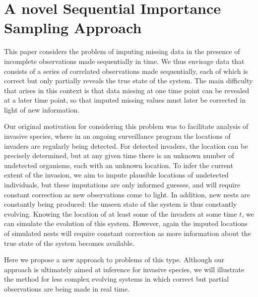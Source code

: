 \chapter[A novel Sequential Importance Sampling Approach]{A novel Sequential Importance Sampling Approach}
\label{ch:SIS}


This paper considers the problem of imputing missing data in the presence of incomplete observations made sequentially in time. We thus envisage data that consists of a series of correlated observations made sequentially, each of which is correct but only partially reveals the true state of the system. The main difficulty that arises in this context is that data missing at one time point can be revealed at a later time point, so that imputed missing values must later be corrected in light of new information.

Our original motivation for considering this problem was to facilitate analysis of invasive species, where in an ongoing surveillance program the locations of invaders are regularly being detected. For detected invaders, the location can be precisely determined, but at any given time there is an unknown number of undetected organisms, each with an unknown location. To infer the current extent of the invasion, we aim to impute plausible locations of undetected individuals, but these imputations are only informed guesses, and will require constant correction as new observations come to light. In addition, new nests are constantly being produced: the unseen state of the system is thus constantly evolving. Knowing the location of at least some of the invaders at some time $t$, we can simulate the evolution of this system. However, again the imputed locations of simulated nests will require constant correction as more information about the true state of the system becomes available.

Here we propose a new approach to problems of this type. Although our approach is ultimately aimed at inference for invasive species, we will illustrate the method for less complex evolving systems in which correct but partial observations are being made in real time.

